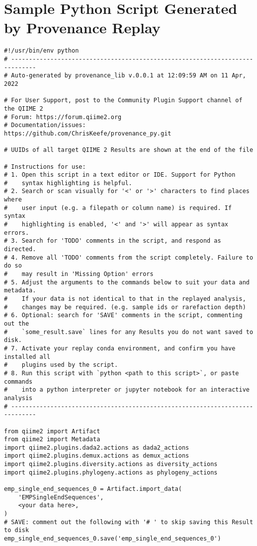 \chapter{Sample Python Script Generated by Provenance Replay}
\label{app:PythonScript}

\begin{footnotesize}
\begin{verbatim}
#!/usr/bin/env python
# -----------------------------------------------------------------------------
# Auto-generated by provenance_lib v.0.0.1 at 12:09:59 AM on 11 Apr, 2022

# For User Support, post to the Community Plugin Support channel of the QIIME 2
# Forum: https://forum.qiime2.org
# Documentation/issues: https://github.com/ChrisKeefe/provenance_py.git

# UUIDs of all target QIIME 2 Results are shown at the end of the file

# Instructions for use:
# 1. Open this script in a text editor or IDE. Support for Python
#    syntax highlighting is helpful.
# 2. Search or scan visually for '<' or '>' characters to find places where
#    user input (e.g. a filepath or column name) is required. If syntax
#    highlighting is enabled, '<' and '>' will appear as syntax errors.
# 3. Search for 'TODO' comments in the script, and respond as directed.
# 4. Remove all 'TODO' comments from the script completely. Failure to do so
#    may result in 'Missing Option' errors
# 5. Adjust the arguments to the commands below to suit your data and metadata.
#    If your data is not identical to that in the replayed analysis,
#    changes may be required. (e.g. sample ids or rarefaction depth)
# 6. Optional: search for 'SAVE' comments in the script, commenting out the
#    `some_result.save` lines for any Results you do not want saved to disk.
# 7. Activate your replay conda environment, and confirm you have installed all
#    plugins used by the script.
# 8. Run this script with `python <path to this script>`, or paste commands
#    into a python interpreter or jupyter notebook for an interactive analysis
# -----------------------------------------------------------------------------

from qiime2 import Artifact
from qiime2 import Metadata
import qiime2.plugins.dada2.actions as dada2_actions
import qiime2.plugins.demux.actions as demux_actions
import qiime2.plugins.diversity.actions as diversity_actions
import qiime2.plugins.phylogeny.actions as phylogeny_actions

emp_single_end_sequences_0 = Artifact.import_data(
    'EMPSingleEndSequences',
    <your data here>,
)
# SAVE: comment out the following with '# ' to skip saving this Result to disk
emp_single_end_sequences_0.save('emp_single_end_sequences_0')


\end{verbatim}
\end{footnotesize}
